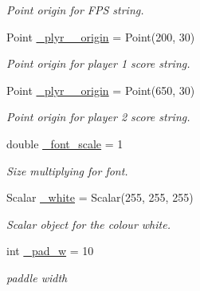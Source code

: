 \begin{DoxyCompactItemize}
\begin{DoxyCompactList}\small\item\em Point origin for F\+PS string. \end{DoxyCompactList}\item 
\hypertarget{class_c_pong_acc79c92d662e6cbe352ed2d795515330}{}\label{class_c_pong_acc79c92d662e6cbe352ed2d795515330} 
Point \hyperlink{class_c_pong_acc79c92d662e6cbe352ed2d795515330}{\+\_\+plyr\+\_\+\_\+origin} = Point(200, 30)
\begin{DoxyCompactList}\small\item\em Point origin for player 1 score string. \end{DoxyCompactList}\item 
\hypertarget{class_c_pong_a4d9041350ca569b65670f032b4fe779f}{}\label{class_c_pong_a4d9041350ca569b65670f032b4fe779f} 
Point \hyperlink{class_c_pong_a4d9041350ca569b65670f032b4fe779f}{\+\_\+plyr\+\_\+\_\+origin} = Point(650, 30)
\begin{DoxyCompactList}\small\item\em Point origin for player 2 score string. \end{DoxyCompactList}\item 
\hypertarget{class_c_pong_a29a067e605e1e34e7777b7d9de984d94}{}\label{class_c_pong_a29a067e605e1e34e7777b7d9de984d94} 
double \hyperlink{class_c_pong_a29a067e605e1e34e7777b7d9de984d94}{\+\_\+font\+\_\+scale} = 1
\begin{DoxyCompactList}\small\item\em Size multiplying for font. \end{DoxyCompactList}\item 
\hypertarget{class_c_pong_a5c98041150a0873ca5dd432e4bd70981}{}\label{class_c_pong_a5c98041150a0873ca5dd432e4bd70981} 
Scalar \hyperlink{class_c_pong_a5c98041150a0873ca5dd432e4bd70981}{\+\_\+white} = Scalar(255, 255, 255)
\begin{DoxyCompactList}\small\item\em Scalar object for the colour white. \end{DoxyCompactList}\item 
\hypertarget{class_c_pong_a4e5f5d5c1cca75edd23b0fffe937a13f}{}\label{class_c_pong_a4e5f5d5c1cca75edd23b0fffe937a13f} 
int \hyperlink{class_c_pong_a4e5f5d5c1cca75edd23b0fffe937a13f}{\+\_\+pad\+\_\+w} = 10
\begin{DoxyCompactList}\small\item\em paddle width \end{DoxyCompactList}\item 

\end{DoxyCompactItemize}
